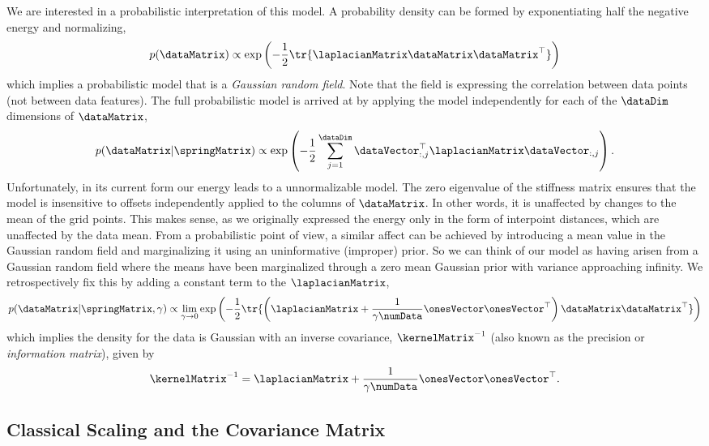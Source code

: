 We are interested in a probabilistic interpretation of this model. A
probability density can be formed by exponentiating half the negative
energy and normalizing,
\[
p(\dataMatrix) \propto \exp\left(-\frac{1}{2}\tr{\laplacianMatrix
    \dataMatrix\dataMatrix^\top}\right)
\]
which implies a probabilistic model that is a \emph{Gaussian random field}. Note that the field is expressing the correlation between data points (not between data features). The full probabilistic model is arrived at by applying the model independently for each of the $\dataDim$ dimensions of $\dataMatrix$,
\[
p(\dataMatrix|\springMatrix) \propto
\exp\left(-\frac{1}{2}\sum_{j=1}^\dataDim\dataVector_{:,j}^\top\laplacianMatrix
  \dataVector_{:,j}\right).
\]
Unfortunately, in its current form our energy leads to a
unnormalizable model. The zero eigenvalue of the stiffness matrix
ensures that the model is insensitive to offsets independently applied
to the columns of $\dataMatrix$. In other words, it is unaffected by
changes to the mean of the grid points. This makes sense, as we
originally expressed the energy only in the form of interpoint
distances, which are unaffected by the data mean. From a probabilistic
point of view, a similar affect can be achieved by introducing a mean
value in the Gaussian random field and marginalizing it using an
uninformative (improper) prior. So we can think of our model as having
arisen from a Gaussian random field where the means have been
marginalized through a zero mean Gaussian prior with variance
approaching infinity. We retrospectively fix this by adding a constant
term to the $\laplacianMatrix$,
\[
p(\dataMatrix|\springMatrix, \gamma) \propto \lim_{\gamma\rightarrow 0}\exp\left(-\frac{1}{2}\tr{\left(\laplacianMatrix +
        \frac{1}{\gamma\numData}\onesVector\onesVector^\top\right)\dataMatrix\dataMatrix^\top}\right)
\]
which implies the density for the data is Gaussian with an inverse
covariance, $\kernelMatrix^{-1}$ (also known as the precision or
\emph{information matrix}), given by
\begin{align}
\kernelMatrix^{-1}=\laplacianMatrix +
\frac{1}{\gamma\numData}\onesVector\onesVector^\top.\label{eqn:covDefinition}
\end{align}

\subsection{Classical Scaling and the Covariance Matrix}

